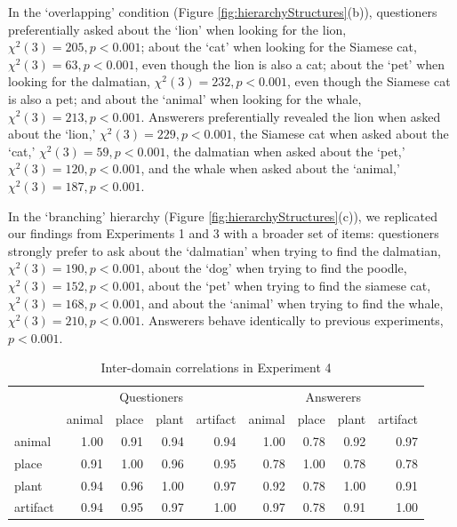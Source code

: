\documentclass[12pt, floatsintext, jou]{apa6}
\begin{document}
In the `overlapping' condition (Figure \ref{fig:hierarchyStructures}(b)), questioners preferentially asked about the `lion' when looking for the lion, $\chi^2(3) = 205, p < 0.001$; about the `cat' when looking for the Siamese cat, $\chi^2(3) = 63, p < 0.001$, even though the lion is also a cat; about the `pet' when looking for the dalmatian, $\chi^2(3) = 232, p < 0.001$, even though the Siamese cat is also a pet; and about the `animal' when looking for the whale, $\chi^2(3) = 213, p < 0.001$. Answerers preferentially revealed the lion when asked about the `lion,' $\chi^2(3) = 229, p < 0.001$, the Siamese cat when asked about the `cat,' $\chi^2(3) = 59, p < 0.001$, the dalmatian when asked about the `pet,' $\chi^2(3) = 120, p < 0.001$, and the whale when asked about the `animal,' $\chi^2(3) = 187, p < 0.001$. 

In the `branching' hierarchy (Figure \ref{fig:hierarchyStructures}(c)), we replicated our findings from Experiments 1 and 3 with a broader set of items: questioners strongly prefer to ask about the `dalmatian' when trying to find the dalmatian, $\chi^2(3) = 190, p < 0.001$, about the `dog' when trying to find the poodle, $\chi^2(3) = 152, p < 0.001$, about the `pet' when trying to find the siamese cat, $\chi^2(3) = 168, p < 0.001$, and about the `animal' when trying to find the whale, $\chi^2(3) = 210, p < 0.001$. Answerers behave identically to previous experiments, $p < 0.001$.

\begin{table}[b]
\centering
\begin{tabular}{ p{1.5cm} | r | r | r | r |||||| r | r | r | r |}
& \multicolumn{4}{c||||||}{Questioners} & \multicolumn{4}{c}{Answerers} \\
&             animal &     place &     plant &  artifact &            animal &     place &     plant &  artifact \\
\hline
animal &   1.00 &  0.91 & 0.94 & 0.94 & 1.00 & 0.78 & 0.92 &  0.97 \\
\hline
place &    0.91 &  1.00 & 0.96 & 0.95 & 0.78 & 1.00 &  0.78 & 0.78 \\
\hline
plant &    0.94 & 0.96 & 1.00 & 0.97 & 0.92  & 0.78 &  1.00 & 0.91\\
\hline
artifact & 0.94 & 0.95 & 0.97 & 1.00 & 0.97 & 0.78 &  0.91 & 1.00\\
\end{tabular}
\\[1.5pt]
\caption{Inter-domain correlations in Experiment 4} 
\label{table:experiment4correlations}
\end{table}
\end{document}
